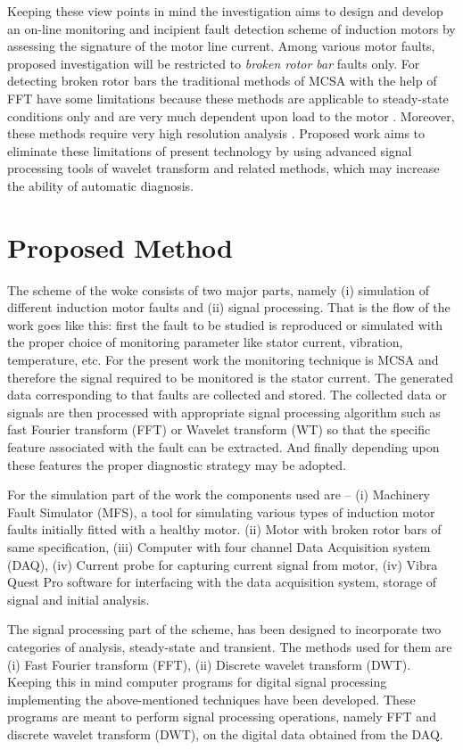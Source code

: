 \documentclass[conference]{IEEEtran}
\begin{document}
Keeping these view points in mind the investigation aims to design and develop an on-line monitoring and incipient fault detection scheme of induction motors by assessing the signature of the motor line current. Among various motor faults, proposed investigation will be restricted to \emph{broken rotor bar} faults only. For detecting broken rotor bars the traditional methods of MCSA with the help of FFT \cite{00873206} have some limitations because these methods are applicable to steady-state conditions only and are very much dependent upon load to the motor \cite{antonino}. Moreover, these methods require very high resolution analysis . Proposed work aims to eliminate these limitations of present technology by using advanced signal processing tools of wavelet transform and related methods, which may increase the ability of automatic diagnosis.

\section{Proposed Method}

The scheme of the woke consists of two major parts, namely (i) simulation of different induction motor faults and (ii) signal processing. That is the flow of the work goes like this: first the fault to be studied is reproduced or simulated with the proper choice of monitoring parameter like stator current, vibration, temperature, etc. For the present work the monitoring technique is MCSA and therefore the signal required to be monitored is the stator current. The generated data corresponding to that faults are collected and stored. The collected data or signals are then processed with appropriate signal processing algorithm such as fast Fourier transform (FFT) or Wavelet transform (WT) so that the specific feature associated with the fault can be extracted. And finally depending upon these features the proper diagnostic strategy may be adopted. 

For the simulation part of the work the components used are -- (i) Machinery Fault Simulator (MFS), a tool for simulating various types of induction motor faults initially fitted with a healthy motor. (ii) Motor with broken rotor bars of same specification, (iii) Computer with four channel Data Acquisition system (DAQ), (iv) Current probe for capturing current signal from motor, (iv) Vibra Quest Pro software for interfacing with the data acquisition system, storage of signal and initial analysis.

The signal processing part of the scheme, has been designed to incorporate two categories of analysis, steady-state and transient. The methods used for them are (i) Fast Fourier transform (FFT), (ii) Discrete wavelet transform (DWT). Keeping this in mind computer programs for digital signal processing implementing the above-mentioned techniques have been developed. These programs are meant to perform signal processing operations, namely FFT and discrete wavelet transform (DWT), on the digital data obtained from the DAQ.
\end{document}

